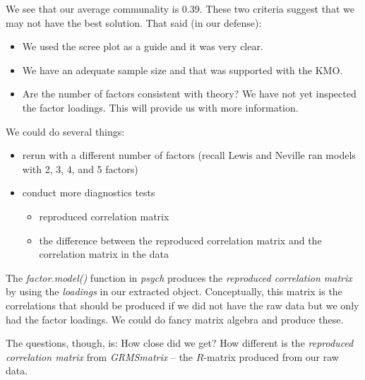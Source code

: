 \documentclass[
  english,
]{book}
\newenvironment{Shaded}{\begin{snugshade}}{\end{snugshade}}
\newcommand{\CommentTok}[1]{\textcolor[rgb]{0.56,0.35,0.01}{\textit{#1}}}
\newcommand{\DecValTok}[1]{\textcolor[rgb]{0.00,0.00,0.81}{#1}}
\newcommand{\KeywordTok}[1]{\textcolor[rgb]{0.13,0.29,0.53}{\textbf{#1}}}
\newcommand{\NormalTok}[1]{#1}
\newcommand{\OperatorTok}[1]{\textcolor[rgb]{0.81,0.36,0.00}{\textbf{#1}}}
\providecommand{\tightlist}{%
  \setlength{\itemsep}{0pt}\setlength{\parskip}{0pt}}
\begin{document}
We see that our average communality is 0.39. These two criteria suggest that we may not have the best solution. That said (in our defense):

\begin{itemize}
\tightlist
\item
  We used the scree plot as a guide and it was very clear.
\item
  We have an adequate sample size and that was supported with the KMO.
\item
  Are the number of factors consistent with theory? We have not yet inspected the factor loadings. This will provide us with more information.
\end{itemize}

We could do several things:

\begin{itemize}
\tightlist
\item
  rerun with a different number of factors (recall Lewis and Neville \citeyearpar{lewis_construction_2015} ran models with 2, 3, 4, and 5 factors)
\item
  conduct more diagnostics tests

  \begin{itemize}
  \tightlist
  \item
    reproduced correlation matrix
  \item
    the difference between the reproduced correlation matrix and the correlation matrix in the data
  \end{itemize}
\end{itemize}

The \emph{factor.model()} function in \emph{psych} produces the \emph{reproduced correlation matrix} by using the \emph{loadings} in our extracted object. Conceptually, this matrix is the correlations that should be produced if we did not have the raw data but we only had the factor loadings. We could do fancy matrix algebra and produce these.

The questions, though, is: How close did we get? How different is the \emph{reproduced correlation matrix} from \emph{GRMSmatrix} -- the \(R\)-matrix produced from our raw data.

\begin{Shaded}
\end{Shaded}
\end{document}
